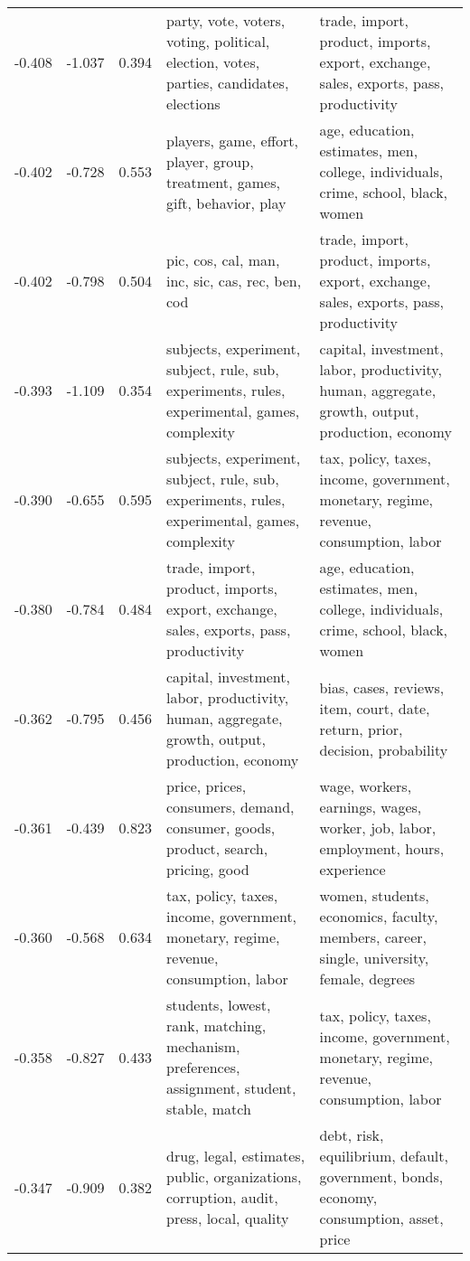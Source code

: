 \begin{tabular}{cccp{5cm}p{5cm}}
-0.408 & -1.037 & 0.394 & party, vote, voters, voting, political, election, votes, parties, candidates, elections & trade, import, product, imports, export, exchange, sales, exports, pass, productivity \\
-0.402 & -0.728 & 0.553 & players, game, effort, player, group, treatment, games, gift, behavior, play & age, education, estimates, men, college, individuals, crime, school, black, women \\
-0.402 & -0.798 & 0.504 & pic, cos, cal, man, inc, sic, cas, rec, ben, cod & trade, import, product, imports, export, exchange, sales, exports, pass, productivity \\
-0.393 & -1.109 & 0.354 & subjects, experiment, subject, rule, sub, experiments, rules, experimental, games, complexity & capital, investment, labor, productivity, human, aggregate, growth, output, production, economy \\
-0.390 & -0.655 & 0.595 & subjects, experiment, subject, rule, sub, experiments, rules, experimental, games, complexity & tax, policy, taxes, income, government, monetary, regime, revenue, consumption, labor \\
-0.380 & -0.784 & 0.484 & trade, import, product, imports, export, exchange, sales, exports, pass, productivity & age, education, estimates, men, college, individuals, crime, school, black, women \\
-0.362 & -0.795 & 0.456 & capital, investment, labor, productivity, human, aggregate, growth, output, production, economy & bias, cases, reviews, item, court, date, return, prior, decision, probability \\
-0.361 & -0.439 & 0.823 & price, prices, consumers, demand, consumer, goods, product, search, pricing, good & wage, workers, earnings, wages, worker, job, labor, employment, hours, experience \\
-0.360 & -0.568 & 0.634 & tax, policy, taxes, income, government, monetary, regime, revenue, consumption, labor & women, students, economics, faculty, members, career, single, university, female, degrees \\
-0.358 & -0.827 & 0.433 & students, lowest, rank, matching, mechanism, preferences, assignment, student, stable, match & tax, policy, taxes, income, government, monetary, regime, revenue, consumption, labor \\
-0.347 & -0.909 & 0.382 & drug, legal, estimates, public, organizations, corruption, audit, press, local, quality & debt, risk, equilibrium, default, government, bonds, economy, consumption, asset, price \\

\end{tabular}
